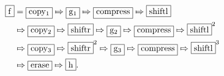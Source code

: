 \begin{solution}
\begin{align*}
    \machine{f}&=\machine{copy_1}\concat \machine{g_1} \concat \machine{compress} \concat \machine{shiftl}\\
    &\concat \machine{copy_2} \concat \machine{shiftr} \concat \machine{g_2} \concat \machine{compress} \concat \machine{shiftl}^2 \\
    &\concat \machine{copy_3} \concat \machine{shiftr}^2 \concat \machine{g_3} \concat \machine{compress} \concat \machine{shiftl}^3 \\
    &\concat \machine{erase} \concat \machine{h}.
\end{align*}

\end{solution}